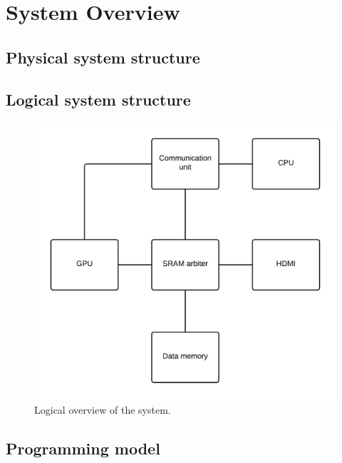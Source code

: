 \chapter{System Overview}

\section{Physical system structure}


\section{Logical system structure}
\begin{figure}[H]
	\centering
	\includegraphics[scale=0.3]{system_overview/diagrams/logical_overview.png}
	\caption{Logical overview of the system.}
	\label{logical_overview}
\end{figure}



\section{Programming model}

